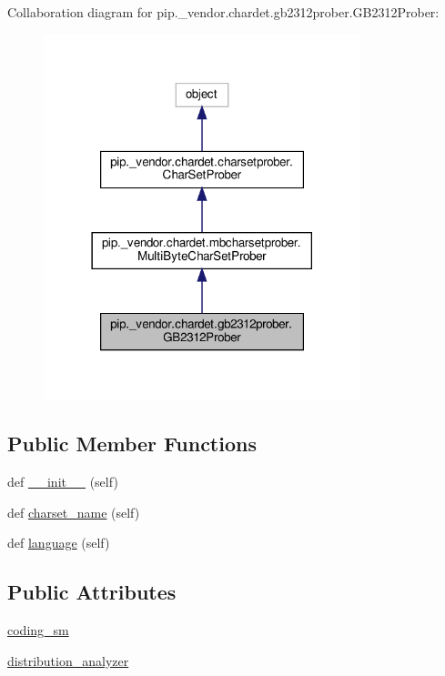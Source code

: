 Collaboration diagram for pip.\+\_\+vendor.\+chardet.\+gb2312prober.\+G\+B2312\+Prober\+:
\nopagebreak
\begin{figure}[H]
\begin{center}
\leavevmode
\includegraphics[width=261pt]{classpip_1_1__vendor_1_1chardet_1_1gb2312prober_1_1GB2312Prober__coll__graph}
\end{center}
\end{figure}
\subsection*{Public Member Functions}
\begin{DoxyCompactItemize}
\item 
def \hyperlink{classpip_1_1__vendor_1_1chardet_1_1gb2312prober_1_1GB2312Prober_a3f42640bc8e8259a544197072b13f467}{\+\_\+\+\_\+init\+\_\+\+\_\+} (self)
\item 
def \hyperlink{classpip_1_1__vendor_1_1chardet_1_1gb2312prober_1_1GB2312Prober_a4c8b7ee64c6e8124c3f8c5092ea686c4}{charset\+\_\+name} (self)
\item 
def \hyperlink{classpip_1_1__vendor_1_1chardet_1_1gb2312prober_1_1GB2312Prober_a4eecf0514f79e6fa01e511d8344c1111}{language} (self)
\end{DoxyCompactItemize}
\subsection*{Public Attributes}
\begin{DoxyCompactItemize}
\item 
\hyperlink{classpip_1_1__vendor_1_1chardet_1_1gb2312prober_1_1GB2312Prober_a73c7b568eba6eacbec5051e7e3ca0878}{coding\+\_\+sm}
\item 
\hyperlink{classpip_1_1__vendor_1_1chardet_1_1gb2312prober_1_1GB2312Prober_a89156b62c605e7977ea0f0a68d1f4faf}{distribution\+\_\+analyzer}
\end{DoxyCompactItemize}
